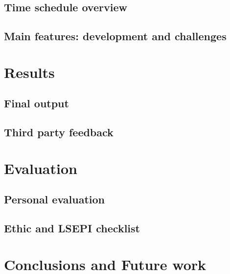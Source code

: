 \documentclass[12pt,twoside]{article}
\begin{document}
\subsection{Time schedule overview}


\clearpage
\subsection{Main features: development and challenges}




\clearpage


\section{Results}
\clearpage
\subsection{Final output}


\clearpage
\subsection{Third party feedback}



\clearpage


\section{Evaluation}

\clearpage
\subsection{Personal evaluation}


\clearpage
\subsection{Ethic and LSEPI checklist}


\clearpage
\section{Conclusions and Future work}
\end{document}
